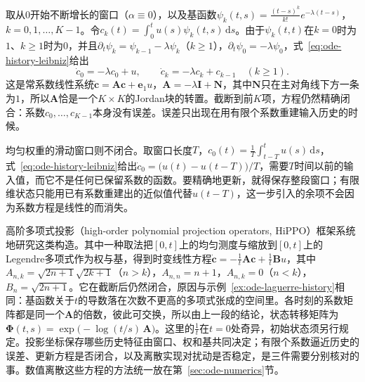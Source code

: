 \begin{example}[指数权下的闭合历史状态]
  \label{ex:ode-laguerre-history}
  取从$0$开始不断增长的窗口（$\alpha\equiv0$），以及基函数$\psi_k(t,s)=\frac{(t-s)^k}{k!}e^{-\lambda(t-s)}$，$k=0,1,\ldots,K-1$。令$c_k(t)=\int_0^tu(s)\psi_k(t,s)\,\mathrm ds$。由于$\psi_k(t,t)$在$k=0$时为$1$、$k\geq1$时为$0$，并且$\partial_t\psi_k=\psi_{k-1}-\lambda\psi_k$（$k\geq1$），$\partial_t\psi_0=-\lambda\psi_0$，式~\eqref{eq:ode-history-leibniz}给出
  \[
    \dot c_0=-\lambda c_0+u,\qquad\dot c_k=-\lambda c_k+c_{k-1}\quad(k\geq1).
  \]
  这是常系数线性系统$\dot{\bm c}=\bm A\bm c+\bm e_1u$，$\bm A=-\lambda\bm I+\bm N$，其中$\bm N$只在主对角线下方一条为$1$，所以$\bm A$恰是一个$K\times K$的Jordan块的转置。截断到前$K$项，方程仍然精确闭合：系数$c_0,\ldots,c_{K-1}$本身没有误差。误差只出现在用有限个系数重建输入历史的时候。
\end{example}

均匀权重的滑动窗口则不闭合。取窗口长度$T$，$c_0(t)=\frac1T\int_{t-T}^tu(s)\,\mathrm ds$，式~\eqref{eq:ode-history-leibniz}给出$\dot c_0=\bigl(u(t)-u(t-T)\bigr)/T$，需要$T$时间以前的输入值，而它不是任何已保留系数的函数。要精确地更新，就得保存整段窗口；有限维状态只能用已有系数重建出的近似值代替$u(t-T)$，这一步引入的余项不会因为系数方程是线性的而消失。

高阶多项式投影（high-order polynomial projection operators, HiPPO）框架系统地研究这类构造。其中一种取法把$[0,t]$上的均匀测度与缩放到$[0,t]$上的Legendre多项式作为权与基，得到时变线性方程$\dot{\bm c}=-\frac1t\bm A\bm c+\frac1t\bm Bu$，其中$A_{n,k}=\sqrt{2n+1}\sqrt{2k+1}$（$n>k$），$A_{n,n}=n+1$，$A_{n,k}=0$（$n<k$），$B_n=\sqrt{2n+1}$。它在截断后仍然闭合，原因与示例~\ref{ex:ode-laguerre-history}相同：基函数关于$t$的导数落在次数不更高的多项式张成的空间里。各时刻的系数矩阵都是同一个$\bm A$的倍数，彼此可交换，所以由上一段的结论，状态转移矩阵为$\bm\Phi(t,s)=\exp\bigl(-\log(t/s)\,\bm A\bigr)$。这里的$\tfrac1t$在$t=0$处奇异，初始状态须另行规定。投影坐标保存哪些历史特征由窗口、权和基共同决定；有限个系数逼近历史的误差、更新方程是否闭合，以及离散实现对扰动是否稳定，是三件需要分别核对的事。数值离散这些方程的方法统一放在第~\ref{sec:ode-numerics}节。
